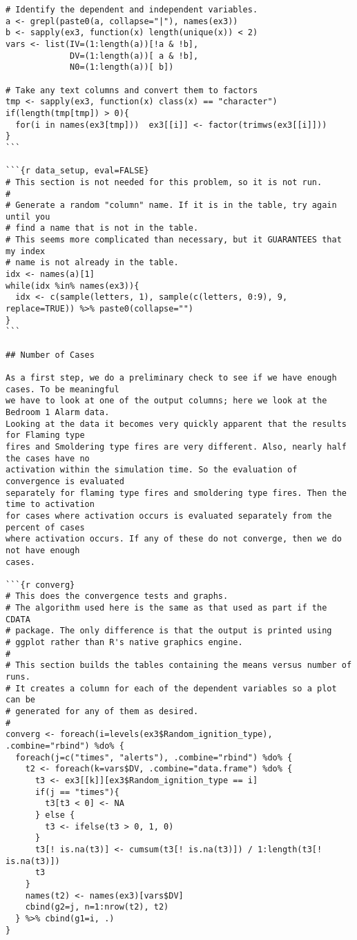\begin{lstlisting}[basicstyle=\scriptsize]
# Identify the dependent and independent variables.
a <- grepl(paste0(a, collapse="|"), names(ex3))
b <- sapply(ex3, function(x) length(unique(x)) < 2)
vars <- list(IV=(1:length(a))[!a & !b],
             DV=(1:length(a))[ a & !b],
             N0=(1:length(a))[ b])

# Take any text columns and convert them to factors
tmp <- sapply(ex3, function(x) class(x) == "character")
if(length(tmp[tmp]) > 0){
  for(i in names(ex3[tmp]))  ex3[[i]] <- factor(trimws(ex3[[i]]))
}
```

```{r data_setup, eval=FALSE}
# This section is not needed for this problem, so it is not run.
#
# Generate a random "column" name. If it is in the table, try again until you
# find a name that is not in the table.
# This seems more complicated than necessary, but it GUARANTEES that my index
# name is not already in the table.
idx <- names(a)[1]
while(idx %in% names(ex3)){
  idx <- c(sample(letters, 1), sample(c(letters, 0:9), 9, replace=TRUE)) %>% paste0(collapse="")
}
```

## Number of Cases

As a first step, we do a preliminary check to see if we have enough cases. To be meaningful
we have to look at one of the output columns; here we look at the Bedroom 1 Alarm data.
Looking at the data it becomes very quickly apparent that the results for Flaming type
fires and Smoldering type fires are very different. Also, nearly half the cases have no
activation within the simulation time. So the evaluation of convergence is evaluated
separately for flaming type fires and smoldering type fires. Then the time to activation
for cases where activation occurs is evaluated separately from the percent of cases
where activation occurs. If any of these do not converge, then we do not have enough
cases.

```{r converg}
# This does the convergence tests and graphs.
# The algorithm used here is the same as that used as part if the CDATA
# package. The only difference is that the output is printed using
# ggplot rather than R's native graphics engine.
#
# This section builds the tables containing the means versus number of runs.
# It creates a column for each of the dependent variables so a plot can be
# generated for any of them as desired.
#
converg <- foreach(i=levels(ex3$Random_ignition_type), .combine="rbind") %do% {
  foreach(j=c("times", "alerts"), .combine="rbind") %do% {
    t2 <- foreach(k=vars$DV, .combine="data.frame") %do% {
      t3 <- ex3[[k]][ex3$Random_ignition_type == i]
      if(j == "times"){
        t3[t3 < 0] <- NA
      } else {
        t3 <- ifelse(t3 > 0, 1, 0)
      }
      t3[! is.na(t3)] <- cumsum(t3[! is.na(t3)]) / 1:length(t3[! is.na(t3)])
      t3
    }
    names(t2) <- names(ex3)[vars$DV]
    cbind(g2=j, n=1:nrow(t2), t2)
  } %>% cbind(g1=i, .)
}


\end{lstlisting}
